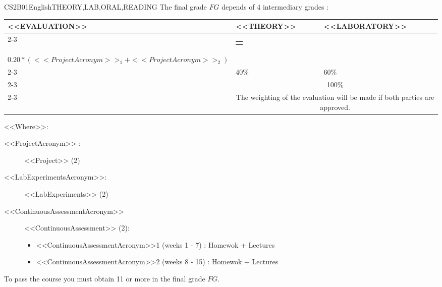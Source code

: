   \begin{evaluation}{CS2B01}{English}{THEORY,LAB,ORAL,READING}
  The final grade $FG$ depends of 4 intermediary grades :
 
  \begin{tabularx}{0.9\textwidth}{|X|p{}|p{}|} \hline
  \multirow{4}{*}{\uppercase{<<Evaluation>>}} & \uppercase{<<Theory>>} & \uppercase{<<Laboratory>>} \\ \cline{2-3}
  & %
      \begin{minipage}{0.95\textwidth}
      \begin{tabular}{l}
        $0.20*(<<ContinuousAssessmentAcronym>>_{1} + <<ContinuousAssessmentAcronym>>_{2})$ 
        \end{tabular} 
      \end{minipage} 
  & %
      \begin{minipage}{0.95\textwidth}
      \begin{tabular}{l}
        $0.10*(<<LabExperimentsAcronym>>_{2} + <<LabExperimentsAcronym>>_{3})$ + \\
        $0.20*(<<ProjectAcronym>>_{1} + <<ProjectAcronym>>_{2})$
      \end{tabular} 
      \end{minipage}                 \\ \cline{2-3}
  
  & %
  40\% 
  & %
  60\% \\ \cline{2-3}
  & \multicolumn{2}{|c|}{100\%}  \\ \cline{2-3}
  & \multicolumn{2}{|c|}{The weighting of the evaluation will be made if both parties are approved.}  \\ \hline
  \end{tabularx}
    
  \vspace{2mm}
  \noindent <<Where>>:
  \begin{description}
    \item[<<ProjectAcronym>> :] <<Project>> (2)
    \item[<<LabExperimentsAcronym>>:] <<LabExperiments>> (2)
    \item[<<ContinuousAssessmentAcronym>>] <<ContinuousAssessment>> (2):
    \begin{itemize}
          \item <<ContinuousAssessmentAcronym>>1 (weeks 1 - 7) : Homewok + Lectures
          \item <<ContinuousAssessmentAcronym>>2 (weeks 8 - 15) : Homewok + Lectures
    \end{itemize}
  \end{description}
  
  \noindent To pass the course you must obtain 11 or more in the final grade $FG$.
  \end{evaluation}


